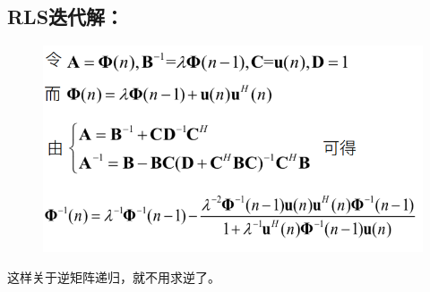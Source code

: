 \documentclass[UTF8]{ctexart} %
\begin{document}
			\subsection{RLS迭代解：}
				\begin{figure}[H]
					\centering\includegraphics[scale=0.4]{59.png}
				\end{figure}
				这样关于逆矩阵递归，就不用求逆了。
				
\end{document}
